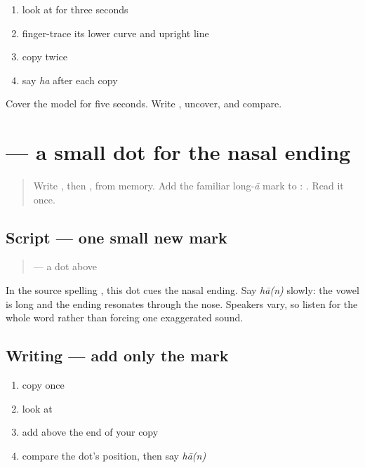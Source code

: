 \begin{enumerate}
\raggedright
  \item look at \textbf{} for three seconds
  \item finger-trace its lower curve and upright line
  \item copy \textbf{} twice
  \item say \emph{ha} after each copy
\end{enumerate}

\begin{tcolorbox}[breakable,colback=teal!4,colframe=teal!35!black,title={Before you move on}]
Cover the model for five seconds. Write \textbf{}, uncover, and compare.
\end{tcolorbox}
\section[\texorpdfstring{\mw{ं} (nasal mark)}{ं (nasal mark)}]{ — a small dot for the nasal ending}

\label{lesson:MW-W03-anusvara}



\begin{quote}
Write \textbf{}, then \textbf{}, from memory. Add the familiar long-\emph{ā} mark to \textbf{}: \textbf{}. Read it once.
\end{quote}

\subsection*{Script — one small new mark}
\begin{quote}
\textbf{} — a dot above
\end{quote}

In the source spelling \textbf{}, this dot cues the nasal ending. Say \emph{hā(n)} slowly: the vowel is long and the ending resonates through the nose. Speakers vary, so listen for the whole word rather than forcing one exaggerated sound.

\subsection*{Writing — add only the mark}

\begin{enumerate}
\raggedright
  \item copy \textbf{} once
  \item look at \textbf{}
  \item add \textbf{} above the end of your copy
  \item compare the dot's position, then say \emph{hā(n)}
\end{enumerate}

